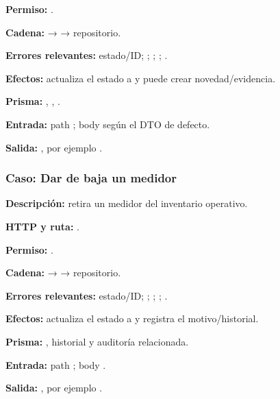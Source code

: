 \textbf{Permiso:} \texttt{}.  

\textbf{Cadena:} \texttt{} → \texttt{} → repositorio.  

\textbf{Errores relevantes:} \texttt{} estado/ID; \texttt{}; \texttt{}; \texttt{}; \texttt{}.  

\textbf{Efectos:} actualiza el estado a \texttt{} y puede crear novedad/evidencia.  

\textbf{Prisma:} \texttt{}, \texttt{}, \texttt{}.  

\textbf{Entrada:} path \texttt{}; body según el DTO de defecto.  

\textbf{Salida:} \texttt{}, por ejemplo \texttt{}.


\subsubsection{Caso: Dar de baja un medidor}


\textbf{Descripción:} retira un medidor del inventario operativo.  

\textbf{HTTP y ruta:} \texttt{}.  

\textbf{Permiso:} \texttt{}.  

\textbf{Cadena:} \texttt{} → \texttt{} → repositorio.  

\textbf{Errores relevantes:} \texttt{} estado/ID; \texttt{}; \texttt{}; \texttt{}; \texttt{}.  

\textbf{Efectos:} actualiza el estado a \texttt{} y registra el motivo/historial.  

\textbf{Prisma:} \texttt{}, historial y auditoría relacionada.  

\textbf{Entrada:} path \texttt{}; body \texttt{}.  

\textbf{Salida:} \texttt{}, por ejemplo \texttt{}.


